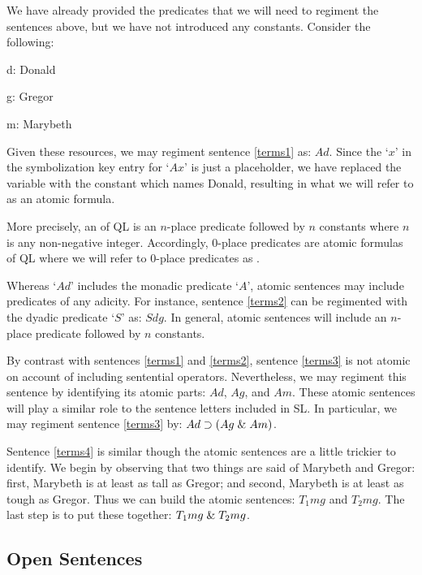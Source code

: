 We have already provided the predicates that we will need to regiment the sentences above, but we have not introduced any constants.
Consider the following:

\begin{groupitems}
\begin{ekey}
\item[d:] Donald
\item[g:] Gregor
\item[m:] Marybeth
\end{ekey}
\end{groupitems}

Given these resources, we may regiment sentence \ref{terms1} as: $Ad$.
Since the `$x$' in the symbolization key entry for `$Ax$' is just a placeholder, we have replaced the variable with the constant which names Donald, resulting in what we will refer to as an atomic formula.

More precisely, an  of QL is an $n$-place predicate followed by $n$ constants where $n$ is any non-negative integer.
Accordingly, $0$-place predicates are atomic formulas of QL where we will refer to $0$-place predicates as .


Whereas `$Ad$' includes the monadic predicate `$A$', atomic sentences may include predicates of any adicity.
For instance, sentence \ref{terms2} can be regimented with the dyadic predicate `$S$' as: $Sdg$.
In general, atomic sentences will include an $n$-place predicate followed by $n$ constants. 

By contrast with sentences \ref{terms1} and \ref{terms2}, sentence \ref{terms3} is not atomic on account of including sentential operators.
Nevertheless, we may regiment this sentence by identifying its atomic parts: $Ad$, $Ag$, and $Am$.
These atomic sentences will play a similar role to the sentence letters included in SL.
In particular, we may regiment sentence \ref{terms3} by: $Ad \supset (Ag \mathrel\& Am)$.

Sentence \ref{terms4} is similar though the atomic sentences are a little trickier to identify.
We begin by observing that two things are said of Marybeth and Gregor: first, Marybeth is at least as tall as Gregor; and second, Marybeth is at least as tough as Gregor.
Thus we can build the atomic sentences: $T_1mg$ and $T_2mg$. 
The last step is to put these together: $T_1mg \mathrel\& T_2mg$.





\subsection{Open Sentences}

